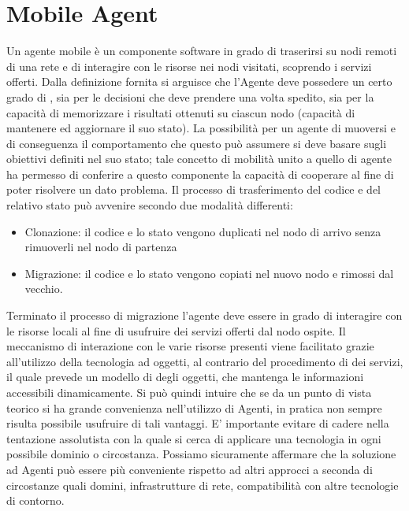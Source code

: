 \section{Mobile Agent}
Un agente mobile\cite{fuggetta} è un componente software in grado di traserirsi su nodi remoti di una rete e di interagire con le risorse nei nodi visitati, scoprendo i servizi offerti.
Dalla definizione fornita si arguisce che l'Agente deve possedere un certo grado di , sia per le decisioni che deve prendere una volta spedito, sia per la capacità di memorizzare i risultati ottenuti su ciascun nodo (capacità di mantenere ed aggiornare il suo stato).
La possibilità per un agente di muoversi e di conseguenza il comportamento che questo può assumere si deve basare sugli obiettivi definiti nel suo stato; tale concetto di mobilità unito a quello di agente ha permesso di conferire a questo componente la capacità di cooperare al fine di poter risolvere un dato problema.
Il processo di trasferimento del codice e del relativo stato può avvenire secondo due modalità differenti:
\begin{itemize}
\item Clonazione: il codice e lo stato vengono duplicati nel nodo di arrivo senza rimuoverli nel nodo di partenza
\item Migrazione: il codice e lo stato vengono copiati nel nuovo nodo e rimossi dal vecchio. 
\end{itemize}
Terminato il processo di migrazione l'agente deve essere in grado di interagire con le risorse locali al fine di usufruire dei servizi offerti dal nodo ospite.
Il meccanismo di interazione con le varie risorse presenti viene facilitato grazie all'utilizzo della tecnologia ad oggetti, al contrario del procedimento di  dei servizi, il quale prevede un modello di    degli oggetti, che mantenga le informazioni accessibili dinamicamente.
Si può quindi intuire che se da un punto di vista teorico si ha grande convenienza nell’utilizzo di Agenti, in pratica non sempre risulta possibile usufruire di tali vantaggi. E’ importante evitare di cadere nella tentazione assolutista con la quale si cerca di applicare una tecnologia in ogni possibile dominio o circostanza. Possiamo sicuramente affermare che la soluzione ad Agenti può essere più conveniente rispetto ad altri approcci a seconda di circostanze quali domini, infrastrutture di rete, compatibilità con altre
tecnologie di contorno.  


